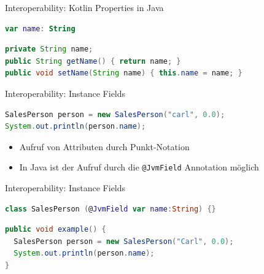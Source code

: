 \documentclass{beamer}
\begin{document}
\begin{frame}[fragile]{Interoperability: Kotlin Properties in Java}
  \begin{lstlisting}[language=Kotlin]
var name: String
    \end{lstlisting}
    \begin{lstlisting}[language=Java]
private String name;
public String getName() { return name; }
public void setName(String name) { this.name = name; }
      \end{lstlisting}
\end{frame}

\begin{frame}[fragile]{Interoperability: Instance Fields}
  \begin{lstlisting}[language=Java]
SalesPerson person = new SalesPerson("carl", 0.0);
System.out.println(person.name);
  \end{lstlisting}
  \begin{itemize}
    \item Aufruf von Attributen durch Punkt-Notation
    \item In Java ist der Aufruf durch die \texttt{@JvmField} Annotation möglich
  \end{itemize}
\end{frame}

\begin{frame}[fragile]{Interoperability: Instance Fields}
  \begin{lstlisting}[language=Kotlin]
class SalesPerson (@JvmField var name:String) {}
  \end{lstlisting}
  \begin{lstlisting}[language=Java]
public void example() {
  SalesPerson person = new SalesPerson("Carl", 0.0);
  System.out.println(person.name);
}
  \end{lstlisting}
\end{frame}
\end{document}
